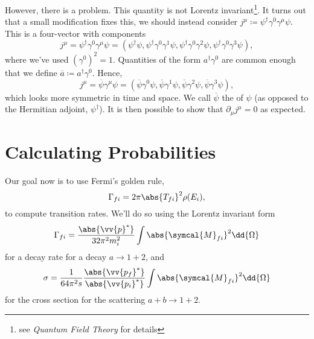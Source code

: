 \documentclass[fleqn]{NotesClass}
\newcommand{\course}[1]{\textit{#1}}
\newcommand{\amplitude}{\symcal{M}}
\newcommand{\hermit}{\dagger}
\begin{document}
    However, there is a problem.
    This quantity is not Lorentz invariant\footnote{see \course{Quantum Field Theory} for details}.
    It turns out that a small modification fixes this, we should instead consider \(j^\mu \coloneqq \psi^\hermit \gamma^0\gamma^\mu \psi\).
    This is a four-vector with components
    \begin{equation}
        j^\mu = \psi^\hermit \gamma^0 \gamma^\mu \psi = (\psi^\hermit \psi, \psi^\hermit \gamma^0\gamma^1\psi, \psi^\hermit \gamma^0\gamma^2\psi, \psi^\hermit \gamma^0\gamma^3\psi),
    \end{equation}
    where we've used \((\gamma^0)^2 = 1\).
    Quantities of the form \(a^\hermit \gamma^0\) are common enough that we define \(\overbar{a} \coloneqq a^\hermit \gamma^0\)\index{\(\overbar{\psi} \coloneqq a^\hermit\gamma^0\)}.
    Hence,
    \begin{equation}
        j^\mu = \overbar{\psi} \gamma^\mu \psi = (\overbar{\psi} \gamma^0 \psi, \overbar{\psi} \gamma^1 \psi, \overbar{\psi} \gamma^2 \psi, \overbar{\psi} \gamma^3 \psi),
    \end{equation}
    which looks more symmetric in time and space.
    We call \(\overbar{\psi}\) the  of \(\psi\) (as opposed to the Hermitian adjoint, \(\psi^\hermit\)).
    It is then possible to show that \(\partial_\mu j^\mu = 0\) as expected.
    
    \section{Calculating Probabilities}
    Our goal now is to use Fermi's golden rule,
    \begin{equation}
        \Gamma_{fi} = 2\pi \abs{T_{fi}}^2 \rho(E_i),
    \end{equation}
    to compute transition rates.
    We'll do so using the Lorentz invariant form
    \begin{equation}
        \Gamma_{fi} = \frac{\abs{\vv{p}^*}}{32\pi^2 m_i^2} \int \abs{\amplitude_{fi}}^2 \dd{\Omega}
    \end{equation}
    for a decay rate for a decay \(a \to 1 + 2\), and
    \begin{equation}
        \sigma = \frac{1}{64\pi^2s} \frac{\abs{\vv{p_f}^*}}{\abs{\vv{p_i}^*}} \int \abs{\amplitude_{fi}}^2 \dd{\Omega}
    \end{equation}
    for the cross section for the scattering \(a + b \to 1 + 2\).
    
\end{document}
